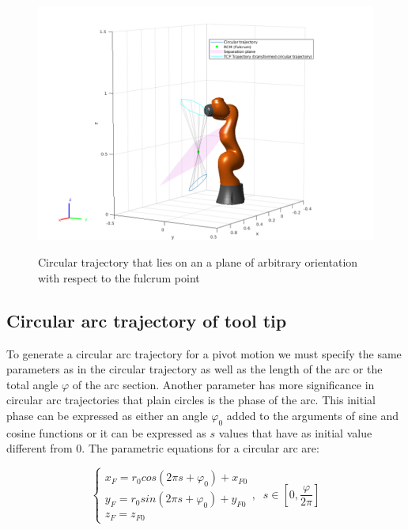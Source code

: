 \begin{center}
\begin{figure}[H]
\centering
\includegraphics[width=\textwidth]{images/rcm_trajectories/robot-pose-random-rcm-circle-traj.png}\\
\caption{Circular trajectory that lies on an a plane of arbitrary orientation with respect to the fulcrum point}
\end{figure}
\end{center}


\subsection{Circular arc trajectory of tool tip}

To generate a circular arc trajectory for a pivot motion we must specify the same parameters as 
in the circular trajectory as well as the length of the arc or the total angle $φ$ of the arc 
section. Another parameter has more significance in circular arc trajectories that plain circles is the phase of the arc. This initial phase can be expressed as either an angle $φ_0$ added to the arguments of 
sine and cosine functions or it can be expressed as $s$ values that have as initial value different from $0$. The parametric equations for a circular arc are:

\begin{equation}
\begin{cases}
x^{}_{F} = r_0cos(2πs + φ_0) + x^{}_{F0} \\
y^{}_{F} = r_0sin(2πs + φ_0) + y^{}_{F0} \\
z^{}_{F} = z^{}_{F0}
\end{cases} ,
\;\;
s \in \left[ 0, \frac{φ}{2π} \right]
\end{equation}

